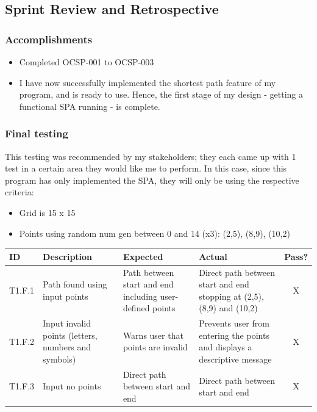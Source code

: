 \subsection{Sprint Review and Retrospective}

\subsubsection{Accomplishments}
\begin{itemize}
    \item Completed OCSP-001 to OCSP-003
    \item  I have now successfully implemented the shortest path feature of my program, and is ready to use. Hence, the first stage of my design - getting a functional SPA running - is complete.
\end{itemize}

\subsubsection{Final testing}

This testing was recommended by my stakeholders; they each came up with 1 test in a certain area they would like me to perform. In this case, since this program has only implemented the SPA, they will only be using the respective criteria:

\begin{itemize}
\item Grid is 15 x 15
\item Points using random num gen between 0 and 14 (x3): (2,5), (8,9), (10,2) 

\end{itemize}

\begin{table}[htbp]
\centering
\begin{tabularx}{\textwidth}{|l|X|p{3.5cm}|p{3.5cm}|c|}
\hline
\textbf{ID} & \textbf{Description} & \textbf{Expected} & \textbf{Actual} & \textbf{Pass?} \\
\hline
T1.F.1 & Path found using input points & Path between start and end including user-defined points& Direct path between start and end stopping at (2,5), (8,9) and (10,2)  & X \\
\hline
T1.F.2 & Input invalid points (letters, numbers and symbols) & Warns user that points are invalid & Prevents user from entering the points and displays a descriptive message & X \\
\hline
T1.F.3 & Input no points &  Direct path between start and end & Direct path between start and end & X \\
\hline
\end{tabularx}
\end{table}

